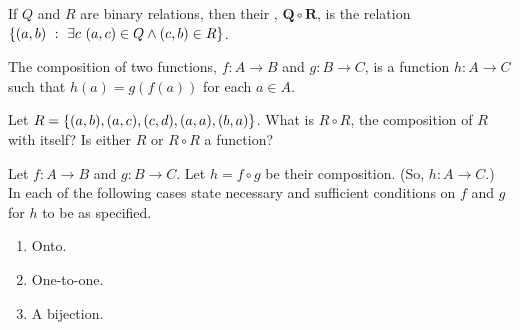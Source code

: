 \begin{defn}
If $Q$ and $R$ are binary relations, then their , $\bm{Q \circ R}$, is the relation $\setbuild{(a, b)}{\exists c\ (a, c) \in Q \land (c, b) \in R}$.

The composition of two functions, $f : A \to B$ and $g : B \to C$, is a function $h : A \to C$ such that $h(a) = g(f(a))$ for each $a \in A$.
\end{defn}

\begin{exer}
Let $R = \left\lbrace (a, b), (a, c), (c, d), (a, a), (b, a) \right\rbrace$. What is $R \circ R$, the composition of $R$ with itself? Is either $R$ or $R \circ R$ a function?
\end{exer}

\begin{exer}
Let $f : A \to B$ and $g : B \to C$. Let $h = f \circ g$ be their composition. (So, $h : A \to C$.) In each of the following cases state necessary and sufficient conditions on $f$ and $g$ for $h$ to be as specified.
\begin{enumerate}[label=(\alph*)]
\item Onto.
\item One-to-one.
\item A bijection.
\end{enumerate}
\end{exer}


